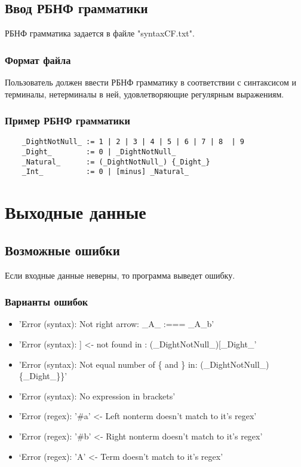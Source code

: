 \documentclass[12pt]{article}
\begin{document}


    \hfill
    \subsection{Ввод РБНФ грамматики}

    РБНФ грамматика задается в файле "syntaxCF.txt".

    \subsubsection*{Формат файла}
    Пользователь должен ввести РБНФ грамматику в соответствии с синтаксисом и терминалы, нетерминалы в ней, удовлетворяющие регулярным выражениям.

    \subsubsection*{Пример РБНФ грамматики}
    \begin{lstlisting}
    _DightNotNull_ := 1 | 2 | 3 | 4 | 5 | 6 | 7 | 8  | 9
    _Dight_        := 0 | _DightNotNull_
    _Natural_      := (_DightNotNull_) {_Dight_}
    _Int_          := 0 | [minus] _Natural_
    \end{lstlisting}

    \clearpage


    \section{Выходные данные}

    \subsection{Возможные ошибки}

    Если входные данные неверны, то программа выведет ошибку.

    \subsubsection*{Варианты ошибок}
    \begin{itemize}
        \item 'Error (syntax): Not right arrow: \_A\_ :=== \_A\_b'
        \item 'Error (syntax): ] <- not found in : (\_DightNotNull\_)[\_Dight\_'
        \item 'Error (syntax): Not equal number of \{ and \}   in: (\_DightNotNull\_)\{\_Dight\_\}\}'
        \item 'Error (syntax): No expression in brackets'
        \item 'Error (regex): '\#a' <- Left nonterm doesn't match to it's regex'
        \item 'Error (regex): '\#b' <- Right nonterm doesn't match to it's regex'
        \item ‘Error (regex): 'A' <- Term doesn't match to it's regex’
    \end{itemize}
\end{document}

